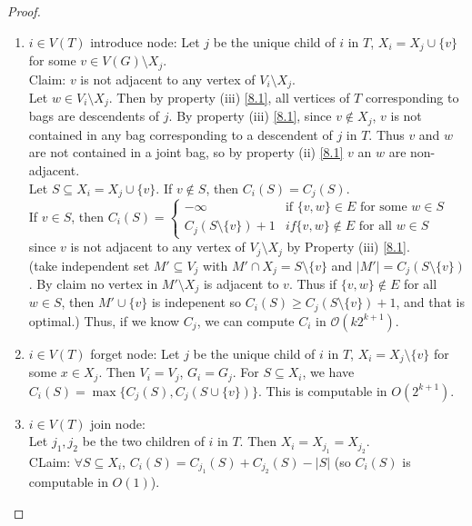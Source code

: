 \begin{proof}
\begin{enumerate}
\begin{center}
    \end{center}
        \item $i\in V(T)$ introduce node: Let $j$ be the unique child of $i$ in $T$, $X_i=X_j\cup \{v\}$ for some $v\in V(G)\setminus X_j$.\\
        Claim: $v$ is not adjacent to any vertex of $V_i\setminus X_j$.\\
        Let $w\in V_i\setminus X_j$. Then by property (iii) \ref{8.1}, all vertices of $T$ corresponding to bags are descendents of $j$. By property (iii) \ref{8.1}, since $v\notin X_j$, $v$ is not contained in any bag corresponding to a descendent of $j$ in $T$. Thus $v$ and $w$ are not contained in a joint bag, so by property (ii) \ref{8.1} $v$ an $w$ are non-adjacent.\\ 
        Let $S\subseteq X_i=X_j\cup\{v\}$. If $v\notin S$, then $C_i(S)=C_j(S)$.\\
        If $v\in S$, then $C_i(S)=\begin{cases}
            -\infty & \text{if } \{v,w\}\in E \text{ for some } w\in S\\
            C_j(S\setminus\{v\})+1 & if \{v,w\}\notin E \text{ for all } w\in S
        \end{cases}$ since $v$ is not adjacent to any vertex of $V_j\setminus X_j$ by Property (iii) \ref{8.1}.\\
        (take independent set $M'\subseteq V_j$ with $M'\cap X_j=S\setminus\{v\}$ and $|M'|=C_j(S\setminus\{v\})$. By claim no vertex in $M'\setminus X_j$ is adjacent to $v$. Thus if $\{v,w\}\notin E$ for all $w\in S$, then $M'\cup \{v\}$ is indepenent so $C_i(S)\geq C_j(S\setminus\{v\})+1$, and that is optimal.)
        Thus, if we know $C_j$, we can compute $C_i$ in $\mathcal{O}(k2^{k+1})$.
        \item $i\in V(T)$ forget node: Let $j$ be the unique child of $i$ in $T$, $X_i=X_j\setminus \{v\}$ for some $x\in X_j$. Then $V_i=V_j$, $G_i=G_j$. For $S\subseteq X_i$, we have $C_i(S)=\max\{C_j(S),C_j(S\cup\{v\})\}.$ This is computable in $O(2^{k+1})$.
        \item $i\in V(T)$ join node: \\
        Let $j_1,j_2$ be the two children of $i$ in $T$. Then $X_i=X_{j_1}=X_{j_2}$.\\
        CLaim: $\forall S\subseteq X_i$, $C_i(S)=C_{j_1}(S)+C_{j_2}(S)-|S|$ (so $C_i(S)$ is computable in $O(1)$).\\

\end{enumerate}
\end{proof}
